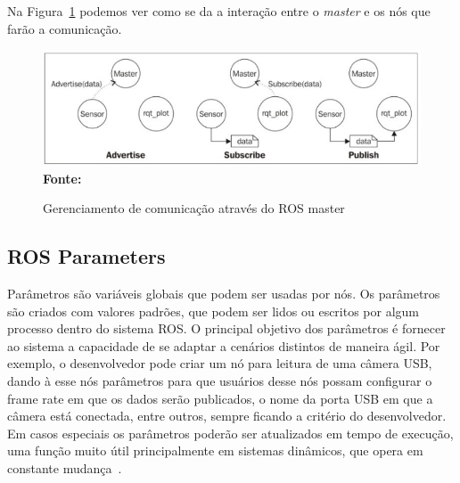 Na Figura~\ref{fig:rosMastering} podemos ver como se da a interação entre o \textit{master} e os nós que farão a comunicação.


\begin{figure}[ht]
	\caption{Gerenciamento de comunicação através do ROS master}
	\begin{center}
		\includegraphics[scale=0.51]{imagens/rosmaster.png}\\
		{\small \textbf{Fonte:} }
    \end{center}\label{fig:rosMastering}
\end{figure}

\subsection{ROS Parameters}

Parâmetros são variáveis globais que podem ser usadas por nós. Os parâmetros são criados com valores padrões, que podem ser lidos ou escritos por algum processo dentro do sistema ROS\@. O principal objetivo dos parâmetros é fornecer ao sistema a capacidade de se adaptar a cenários distintos de maneira ágil. Por exemplo, o desenvolvedor pode criar um nó para leitura de uma câmera USB, dando à esse nós parâmetros para que usuários desse nós possam configurar o frame rate em que os dados serão publicados, o nome da porta USB em que a câmera está conectada, entre outros, sempre ficando a critério do desenvolvedor. Em casos especiais os parâmetros poderão ser atualizados em tempo de execução, uma função muito útil principalmente em sistemas dinâmicos, que opera em constante mudança~\cite{rosLearning}.
